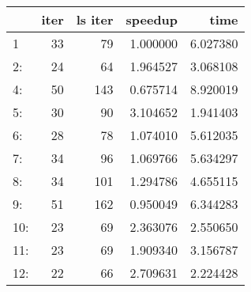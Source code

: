 \begin{tabular}{lrrrr}
\toprule
{} &  iter &  ls iter &   speedup &      time \\
\midrule
1   &    33 &       79 &  1.000000 &  6.027380 \\
2:  &    24 &       64 &  1.964527 &  3.068108 \\
4:  &    50 &      143 &  0.675714 &  8.920019 \\
5:  &    30 &       90 &  3.104652 &  1.941403 \\
6:  &    28 &       78 &  1.074010 &  5.612035 \\
7:  &    34 &       96 &  1.069766 &  5.634297 \\
8:  &    34 &      101 &  1.294786 &  4.655115 \\
9:  &    51 &      162 &  0.950049 &  6.344283 \\
10: &    23 &       69 &  2.363076 &  2.550650 \\
11: &    23 &       69 &  1.909340 &  3.156787 \\
12: &    22 &       66 &  2.709631 &  2.224428 \\
\bottomrule
\end{tabular}

